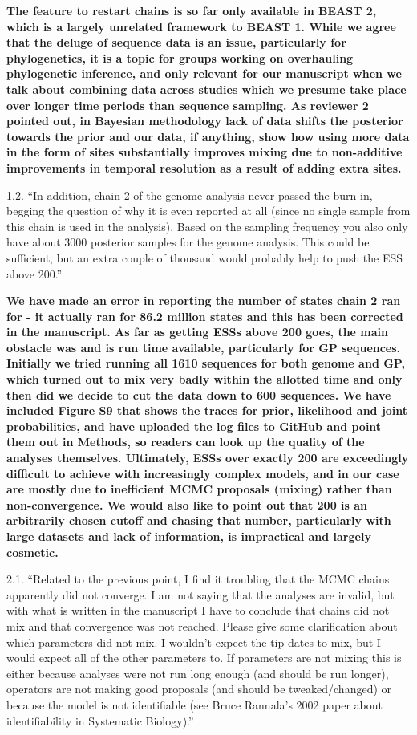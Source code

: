 \documentclass[11pt,oneside,letterpaper]{article}
\begin{document}
\textbf{The feature to restart chains is so far only available in BEAST 2, which is a largely unrelated framework to BEAST 1. While we agree that the deluge of sequence data is an issue, particularly for phylogenetics, it is a topic for groups working on overhauling phylogenetic inference, and only relevant for our manuscript when we talk about combining data across studies which we presume take place over longer time periods than sequence sampling. As reviewer 2 pointed out, in Bayesian methodology lack of data shifts the posterior towards the prior and our data, if anything, show how using more data in the form of sites substantially improves mixing due to non-additive improvements in temporal resolution as a result of adding extra sites.}

1.2. ``In addition, chain 2 of the genome analysis never passed the burn-in, begging the question of why it is even reported at all (since no single sample from this chain is used in the analysis). Based on the sampling frequency you also only have about 3000 posterior samples for the genome analysis. This could be sufficient, but an extra couple of thousand would probably help to push the ESS above 200.''

\textbf{We have made an error in reporting the number of states chain 2 ran for - it actually ran for 86.2 million states and this has been corrected in the manuscript. As far as getting ESSs above 200 goes, the main obstacle was and is run time available, particularly for GP sequences. Initially we tried running all 1610 sequences for both genome and GP, which turned out to mix very badly within the allotted time and only then did we decide to cut the data down to 600 sequences. We have included Figure S9 that shows the traces for prior, likelihood and joint probabilities, and have uploaded the log files to GitHub and point them out in Methods, so readers can look up the quality of the analyses themselves. Ultimately, ESSs over exactly 200 are exceedingly difficult to achieve with increasingly complex models, and in our case are mostly due to inefficient MCMC proposals (mixing) rather than non-convergence. We would also like to point out that 200 is an arbitrarily chosen cutoff and chasing that number, particularly with large datasets and lack of information, is impractical and largely cosmetic.}

2.1. ``Related to the previous point, I find it troubling that the MCMC chains apparently did not converge. I am not saying that the analyses are invalid, but with what is written in the manuscript I have to conclude that chains did not mix and that convergence was not reached. Please give some clarification about which parameters did not mix. I wouldn't expect the tip-dates to mix, but I would expect all of the other parameters to. If parameters are not mixing this is either because analyses were not run long enough (and should be run longer), operators are not making good proposals (and should be tweaked/changed) or because the model is not identifiable (see Bruce Rannala's 2002 paper about identifiability in Systematic Biology).''
\end{document}
